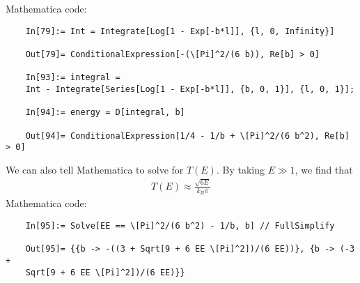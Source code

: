 \documentclass{article}
\theoremstyle{definition}
\newcommand{\f}[2]{\frac{#1}{#2}}
\begin{document}
\begin{enumerate}[label=(\alph*)]
	Mathematica code:
	\begin{lstlisting}
	In[79]:= Int = Integrate[Log[1 - Exp[-b*l]], {l, 0, Infinity}]
	
	Out[79]= ConditionalExpression[-(\[Pi]^2/(6 b)), Re[b] > 0]
	
	In[93]:= integral = 
	Int - Integrate[Series[Log[1 - Exp[-b*l]], {b, 0, 1}], {l, 0, 1}];
	
	In[94]:= energy = D[integral, b]
	
	Out[94]= ConditionalExpression[1/4 - 1/b + \[Pi]^2/(6 b^2), Re[b] > 0]
	\end{lstlisting}
	
	We can also tell Mathematica to solve for $T(E)$. By taking $E \gg 1$, we find that
	\begin{align*}
	\boxed{T(E) \approx \f{\sqrt{{6E}}}{k_B \pi} }
	\end{align*}
	Mathematica code:
	\begin{lstlisting}
	In[95]:= Solve[EE == \[Pi]^2/(6 b^2) - 1/b, b] // FullSimplify
	
	Out[95]= {{b -> -((3 + Sqrt[9 + 6 EE \[Pi]^2])/(6 EE))}, {b -> (-3 + 
	Sqrt[9 + 6 EE \[Pi]^2])/(6 EE)}}
	\end{lstlisting}
	

\end{enumerate}
\end{document}
